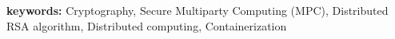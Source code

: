\thispagestyle{empty}
\begin{abstract}
  \noindent
  \lipsum[1]
\end{abstract}
\textbf{keywords: } Cryptography, Secure Multiparty Computing (MPC), Distributed RSA algorithm, Distributed computing, Containerization
\vfill
